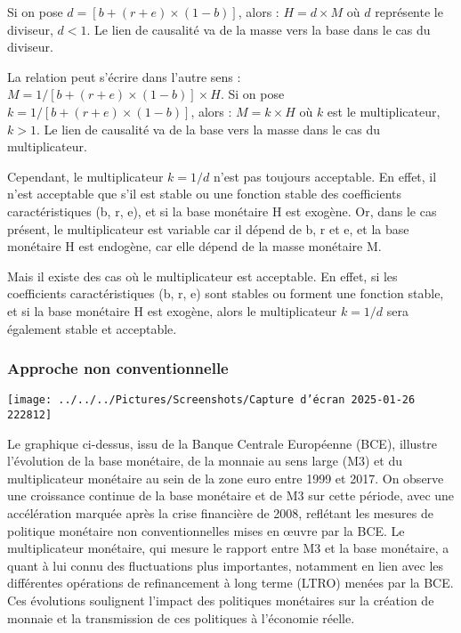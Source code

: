 \documentclass[a4paper, 12pt]{report}
\begin{document}
Si on pose $d = [b + (r + e) \times (1 - b)]$, alors : $H = d \times M$ où $d$ représente le diviseur, $d < 1$. Le lien de causalité va de la masse vers la base dans le cas du diviseur.

La relation peut s'écrire dans l'autre sens : $M = 1/[b + (r + e) \times (1 - b)] \times H$. Si on pose $k = 1/[b + (r + e) \times (1 - b)]$, alors : $M = k \times H$ où $k$ est le multiplicateur, $k > 1$. Le lien de causalité va de la base vers la masse dans le cas du multiplicateur.
	
Cependant, le multiplicateur $k = 1/d$ n'est pas toujours acceptable. En effet, il n'est acceptable que s'il est stable ou une fonction stable des coefficients caractéristiques (b, r, e), et si la base monétaire H est exogène. Or, dans le cas présent, le multiplicateur est variable car il dépend de b, r et e, et la base monétaire H est endogène, car elle dépend de la masse monétaire M.

Mais il existe des cas où le multiplicateur est acceptable. En effet, si les coefficients caractéristiques (b, r, e) sont stables ou forment une fonction stable, et si la base monétaire H est exogène, alors le multiplicateur $k = 1/d$ sera également stable et acceptable.

\subsubsection{Approche non conventionnelle}

\begin{center}
	\texttt{[image: ../../../Pictures/Screenshots/Capture d'écran 2025-01-26 222812]}
\end{center}


Le graphique ci-dessus, issu de la Banque Centrale Européenne (BCE), illustre l'évolution de la base monétaire, de la monnaie au sens large (M3) et du multiplicateur monétaire au sein de la zone euro entre 1999 et 2017. On observe une croissance continue de la base monétaire et de M3 sur cette période, avec une accélération marquée après la crise financière de 2008, reflétant les mesures de politique monétaire non conventionnelles mises en œuvre par la BCE. Le multiplicateur monétaire, qui mesure le rapport entre M3 et la base monétaire, a quant à lui connu des fluctuations plus importantes, notamment en lien avec les différentes opérations de refinancement à long terme (LTRO) menées par la BCE. Ces évolutions soulignent l'impact des politiques monétaires sur la création de monnaie et la transmission de ces politiques à l'économie réelle.
	
\end{document}
